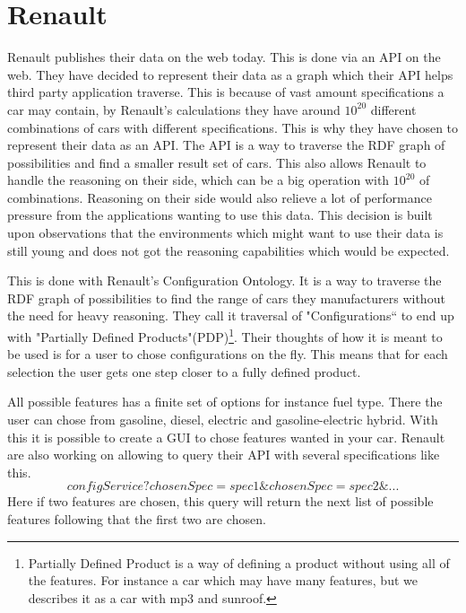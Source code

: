 \section{Renault}
Renault publishes their data on the web today. This is done via an API on the web. 
They have decided to represent their data as a graph which their API helps third
party application traverse. \cite{SemWebAppRes} This is because of vast amount 
specifications a car may contain, by Renault's calculations 
they have around $10^{20}$ different combinations of cars with different specifications.\cite{ren1} 
This is why they have chosen to represent their data as an API. The API is a way to traverse the RDF graph 
of possibilities and find a smaller result set of cars. This also allows Renault 
to handle the reasoning on their side, which can be a big operation with $10^{20}$ 
of combinations. Reasoning on their side would also relieve a lot of performance 
pressure from the applications wanting to use this data. This decision is built 
upon observations that the environments which might want to use their data is 
still young and does not got the reasoning capabilities which would be expected.

This is done with Renault's Configuration Ontology. It is a way to traverse the 
RDF graph of possibilities to find the range of cars they manufacturers without 
the need for heavy reasoning. They call it traversal of "Configurations`` to end up with 
"Partially Defined Products"(PDP)\footnote{Partially Defined Product is a way 
of defining a product without using all of the features. For instance a car which 
may have many features, but we describes it as a car with mp3 and sunroof.}.
Their thoughts of how it is meant to be used is for a user to chose configurations 
on the fly. This means that for each selection the user gets one step closer to a 
fully defined product. 

All possible features has a finite set of options for instance fuel type. There 
the user can chose from gasoline, diesel, electric and gasoline-electric hybrid.\cite{confOnt}
With this it is possible to create a GUI to chose features wanted in your car. 
Renault are also working on allowing to query their API with several specifications like this.
\[ configService?chosenSpec=spec1\&chosenSpec=spec2\&... \]
Here if two features are chosen, this query will return the next list of 
possible features following that the first two are chosen.


